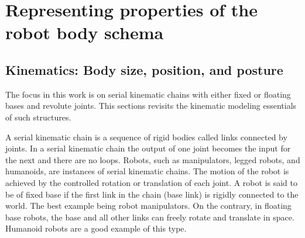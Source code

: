 
\section{Representing properties of the robot body schema}

\subsection{Kinematics: Body size, position, and posture}
The focus in this work is on serial kinematic chains with either fixed or floating bases and revolute joints. This sections revisits the kinematic modeling essentials of such structures.

A serial kinematic chain is a sequence of rigid bodies called links connected by joints. In a serial kinematic chain the output of one joint becomes the input for the next and there are no loops. Robots, such as manipulators, legged robots, and humanoids, are instances of serial kinematic chains. The motion of the robot is achieved by the controlled rotation or translation of each joint.  A robot is said to be of fixed base if the first link in the chain (base link) is rigidly connected to the world. The best example being robot manipulators. On the contrary, in floating base robots, the base and all other links can freely rotate and translate in space. Humanoid robots are a good example of this type.

